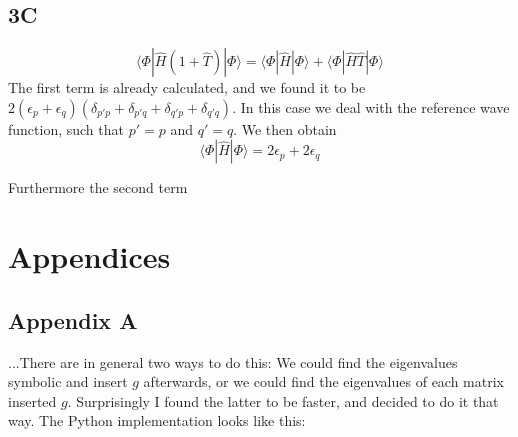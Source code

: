 \documentclass[norsk,a4paper,12pt]{article}
\begin{document}
\subsection*{3C}
\begin{equation}
\langle \Phi|\hat{H}(1+\hat{T})|\Phi\rangle=\langle \Phi|\hat{H}|\Phi\rangle+\langle \Phi|\hat{H}\hat{T}|\Phi\rangle
\end{equation}
The first term is already calculated, and we found it to be $2(\epsilon_p+\epsilon_q)(\delta_{p'p}+\delta_{p'q}+\delta_{q'p}+\delta_{q'q})$. In this case we deal with the reference wave function, such that $p'=p$ and $q'=q$. We then obtain
\begin{equation}
\langle \Phi|\hat{H}|\Phi\rangle=2\epsilon_p+2\epsilon_q
\end{equation}

Furthermore the second term 

\section{Appendices}
\subsection*{Appendix A}
...There are in general two ways to do this: We could find the eigenvalues symbolic and insert $g$ afterwards, or we could find the eigenvalues of each matrix inserted $g$. Surprisingly I found the latter to be faster, and decided to do it that way. The Python implementation looks like this:

\end{document}
